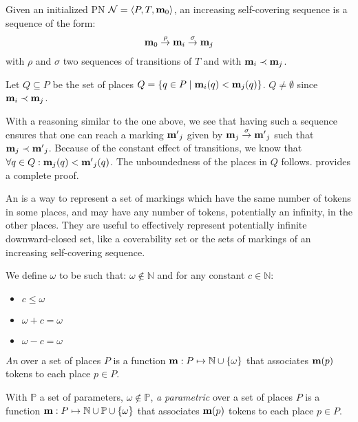 \begin{defi}
  Given an initialized \ac{PN} $\mathcal{N} = \langle P,T, \mathbf{m}_0\rangle$,
  an increasing self-covering sequence is a sequence of the form:
  \[
    \mathbf{m}_0 \stackrel{\rho}{\to} \mathbf{m}_i \stackrel{\sigma}{\to} \mathbf{m}_j
  \]
  with $\rho$ and $\sigma$ two sequences of transitions of $T$
  and with $\mathbf{m}_i \prec \mathbf{m}_j$.
\end{defi}

Let $Q \subseteq P$ be the set of places $Q = \{q \in P \mid \mathbf{m}_i(q) < \mathbf{m}_j(q)\}$.
$Q \neq \emptyset$ since $\mathbf{m}_i \prec \mathbf{m}_j$.

With a reasoning similar to the one above, we see that having such a sequence ensures that one can reach a marking $\mathbf{m'}_j$ given by $\mathbf{m}_j \stackrel{\sigma}{\to} \mathbf{m'}_j$ such that $\mathbf{m}_j \prec \mathbf{m'}_j$.
Because of the constant effect of transitions, we know that $\forall q \in Q : \mathbf{m}_j(q) < \mathbf{m'}_j(q)$.
The unboundedness of the places in $Q$ follows.
\cite{David17} provides a complete proof.

An \omark is a way to represent a set of markings which have the same number of tokens in some places, and may have any number of tokens, potentially an infinity, in the other places.
They are useful to effectively represent potentially infinite downward-closed set, like a coverability set or the sets of markings of an increasing self-covering sequence.

\begin{defi}[\omark]
  We define $\omega$ to be such that:
  $\omega \notin \mathbb{N}$
  and for any constant $c \in \mathbb{N}$:
  \begin{itemize}
    \item $c \leq \omega$
    \item $\omega + c = \omega$
    \item $\omega - c = \omega$
  \end{itemize}

  \emph{An \omark} \mar over a set of places $P$ is a function $\mathbf{m} : P \mapsto \mathbb{N} \cup \{\omega\}$ that associates $\mathbf{m}(p)$ tokens to each place $p \in P$.

  With $\mathbb{P}$ a set of parameters, $\omega \notin \mathbb{P}$,
  \emph{a parametric \omark} \mar over a set of places $P$ is a function $\mathbf{m} : P \mapsto \mathbb{N} \cup \mathbb{P} \cup \{\omega\}$ that associates $\mathbf{m}(p)$ tokens to each place $p \in P$.
\end{defi}

